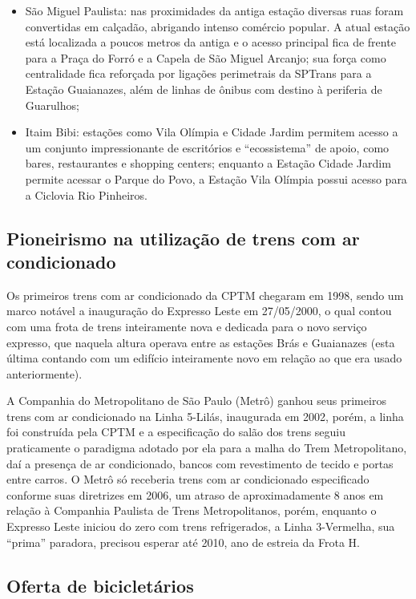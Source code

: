 \documentclass[11pt,fleqn]{book} %
\begin{document}
\begin{itemize}
\begin{itemize}
			\item São Miguel Paulista: nas proximidades da antiga estação diversas ruas foram convertidas em calçadão, abrigando intenso comércio popular. A atual estação está localizada a poucos metros da antiga e o acesso principal fica de frente para a Praça do Forró e a Capela de São Miguel Arcanjo; sua força como centralidade fica reforçada por ligações perimetrais da SPTrans para a Estação Guaianazes, além de linhas de ônibus com destino à periferia de Guarulhos;
			\item Itaim Bibi: estações como Vila Olímpia e Cidade Jardim permitem acesso a um conjunto impressionante de escritórios e “ecossistema” de apoio, como bares, restaurantes e shopping centers; enquanto a Estação Cidade Jardim permite acessar o Parque do Povo, a Estação Vila Olímpia possui acesso para a Ciclovia Rio Pinheiros.
		\end{itemize}
\end{itemize}

\subsection{Pioneirismo na utilização de trens com ar condicionado}

Os primeiros trens com ar condicionado da CPTM chegaram em 1998, sendo um marco notável a inauguração do Expresso Leste em 27/05/2000, o qual contou com uma frota de trens inteiramente nova e dedicada para o novo serviço expresso, que naquela altura operava entre as estações Brás e Guaianazes (esta última contando com um edifício inteiramente novo em relação ao que era usado anteriormente).


A Companhia do Metropolitano de São Paulo (Metrô) ganhou seus primeiros trens com ar condicionado na Linha 5-Lilás, inaugurada em 2002, porém, a linha foi construída pela CPTM e a especificação do salão dos trens seguiu praticamente o paradigma adotado por ela para a malha do Trem Metropolitano, daí a presença de ar condicionado, bancos com revestimento de tecido e portas entre carros. O Metrô só receberia trens com ar condicionado especificado conforme suas diretrizes em 2006, um atraso de aproximadamente 8 anos em relação à Companhia Paulista de Trens Metropolitanos, porém, enquanto o Expresso Leste iniciou do zero com trens refrigerados, a Linha 3-Vermelha, sua “prima” paradora, precisou esperar até 2010, ano de estreia da Frota H.

\subsection{Oferta de bicicletários}
\end{document}
